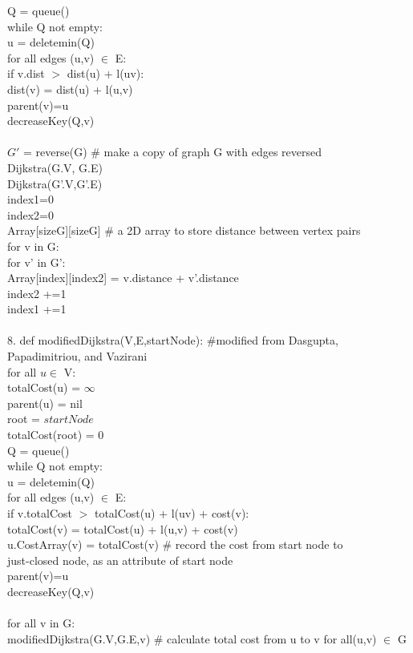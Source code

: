 \documentclass[11pt, oneside]{article}   	%
\begin{document}
\indent Q = queue()\\
\indent while Q not empty:\\
\indent\indent u = deletemin(Q)\\
\indent\indent for all edges (u,v) $ \in $ E:\\
\indent\indent\indent if v.dist $>$  dist(u) + l(uv):\\
\indent\indent\indent\indent dist(v) = dist(u) + l(u,v)\\
\indent\indent\indent\indent parent(v)=u\\
\indent\indent\indent\indent decreaseKey(Q,v)\\
\\
$G'$ = reverse(G) \# make a copy of graph G with edges reversed\\
Dijkstra(G.V, G.E)\\
Dijkstra(G'.V,G'.E)\\
index1=0\\
index2=0\\
Array[sizeG][sizeG] \# a 2D array to store distance between vertex pairs\\
for v in G:\\
\indent for v' in G':\\
\indent\indent Array[index][index2] = v.distance + v'.distance \\ 
\indent\indent index2 +=1\\
\indent index1 +=1\\
\\
8.  def modifiedDijkstra(V,E,startNode): \#modified from Dasgupta, Papadimitriou, and Vazirani\\
\indent for all $u \in$ V:\\
\indent totalCost(u) = $\infty$  \\
\indent parent(u) = nil\\
\indent root = $startNode$\\
\indent totalCost(root) = 0\\
\indent Q = queue()\\
\indent while Q not empty:\\
\indent\indent u = deletemin(Q)\\
\indent\indent for all edges (u,v) $ \in $ E:\\
\indent\indent\indent if v.totalCost $>$  totalCost(u) + l(uv) + cost(v):\\
\indent\indent\indent\indent totalCost(v) = totalCost(u) + l(u,v) + cost(v)\\
\indent\indent\indent\indent u.CostArray(v) = totalCost(v) \# record the cost from start node to\\
\indent\indent\indent\indent\indent\indent just-closed node, as an attribute of start node\\
\indent\indent\indent\indent parent(v)=u\\
\indent\indent\indent\indent decreaseKey(Q,v)\\
\\
\indent for all v in G:\\
\indent\indent modifiedDijkstra(G.V,G.E,v) \# calculate total cost from u to v for all(u,v) $\in$ G\\
\end{document}
